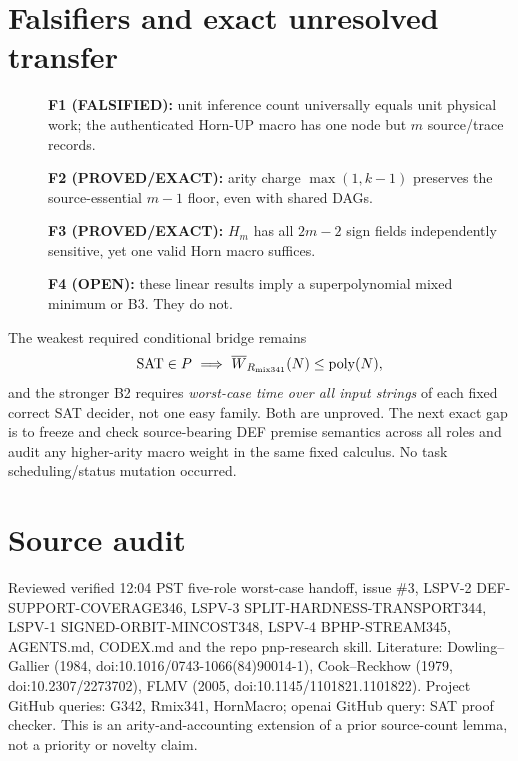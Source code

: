 \documentclass[11pt]{article}
\begin{document}
\section*{Falsifiers and exact unresolved transfer}
\begin{description}
\item[] \textbf{F1 (FALSIFIED):} unit inference count universally equals unit physical work; the authenticated Horn-UP macro has one node but $m$ source/trace records.
\item[] \textbf{F2 (PROVED/EXACT):} arity charge $\max(1,k-1)$ preserves the source-essential $m-1$ floor, even with shared DAGs.
\item[] \textbf{F3 (PROVED/EXACT):} $H_m$ has all $2m-2$ sign fields independently sensitive, yet one valid Horn macro suffices.
\item[] \textbf{F4 (OPEN):} these linear results imply a superpolynomial mixed minimum or B3. They do not.
\end{description}
The weakest required conditional bridge remains
\[
\mathrm{SAT}\in P\ \Longrightarrow\ \overline W_{R_{\rm mix341}}(N)\le\mathrm{poly}(N),
\]
and the stronger B2 requires \emph{worst-case time over all input strings} of each fixed correct SAT decider, not one easy family. Both are unproved. The next exact gap is to freeze and check source-bearing DEF premise semantics across all roles and audit any higher-arity macro weight in the same fixed calculus. No task scheduling/status mutation occurred.

\section*{Source audit}
Reviewed verified 12:04 PST five-role worst-case handoff, issue \#3, LSPV-2 DEF-SUPPORT-COVERAGE346, LSPV-3 SPLIT-HARDNESS-TRANSPORT344, LSPV-1 SIGNED-ORBIT-MINCOST348, LSPV-4 BPHP-STREAM345, AGENTS.md, CODEX.md and the repo pnp-research skill. Literature: Dowling--Gallier (1984, doi:10.1016/0743-1066(84)90014-1), Cook--Reckhow (1979, doi:10.2307/2273702), FLMV (2005, doi:10.1145/1101821.1101822). Project GitHub queries: G342, Rmix341, HornMacro; openai GitHub query: SAT proof checker. This is an arity-and-accounting extension of a prior source-count lemma, not a priority or novelty claim.
\end{document}
